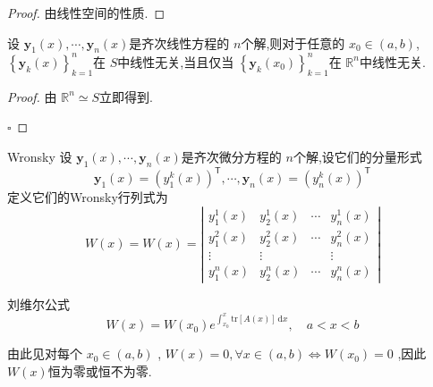 \documentclass[lang=cn,12pt,color=green,fontset=none]{elegantbook}
\begin{document}
\begin{proof}
    由线性空间的性质.
\end{proof}
\begin{proposition}\label{pro:lin-indep-sol}
    设 $
    \mathbf{y}_{1}\left( x \right),\cdots ,\mathbf{y}_{n}\left( x \right)  
    $是齐次线性方程的 $ n $个解,则对于任意的 $ x_0 \in \left( a,b \right)  $, $ \left\{ \mathbf{y}_{k}\left( x \right)  \right\}_{k=1}^{n} $在 $ S $中线性无关,当且仅当 $ \left\{ \mathbf{y}_{k}\left( x_0 \right)  \right\}_{k=1 }^{n} $在 $ \mathbb{R} ^{n} $中线性无关.    
\end{proposition}
\begin{proof}
    由 $ \mathbb{R} ^{n} \simeq S $立即得到. 

    \hfill $\square$
\end{proof}
\begin{definition}{Wronsky}
    设 $ \mathbf{y}_{1}\left( x \right),\cdots ,\mathbf{y}_{n}\left( x \right)   $是齐次微分方程的 $ n $个解,设它们的分量形式 $$
    \mathbf{y}_{1}\left( x \right) = \left( y_{1}^{k}\left( x \right)  \right)^{\mathsf{T}},\cdots ,\mathbf{y}_{n}\left( x \right) = \left( y_{n}^{k}\left( x \right)  \right)^{\mathsf{T}}    
    $$  定义它们的Wronsky行列式为 $$
    W\left( x \right) = \left.W(x)=\left|\begin{array}{cccc}y_1^1(x)&y_2^1(x)&\cdots&y_n^1(x)\\y_1^2(x)&y_2^2(x)&\cdots&y_n^2(x)\\\vdots&\vdots&&\vdots\\y_1^n(x)&y_2^n(x)&\cdots&y_n^n(x)\end{array}\right.\right| 
    $$
\end{definition}

\begin{lemma}{刘维尔公式}\label{liu-formu}
     $$
     W\left( x \right) = W\left( x_0 \right) e^{\int_{x_0}^{x}\mathrm{tr}[A\left( x \right) ]\,\mathrm{d} x} ,\quad  a<x<b
     $$
\end{lemma}

\begin{remark}
    由此见对每个 $ x_0 \in \left( a,b \right)  $ , $ W\left( x \right)  =0 ,\forall x \in \left( a,b \right) \iff W\left( x_0 \right) = 0 $ ,因此 $ W\left( x \right)  $恒为零或恒不为零. 
\end{remark}
\end{document}
